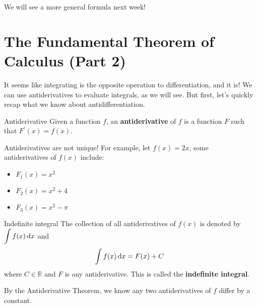 We will see a more general formula next week!

\section{The Fundamental Theorem of Calculus (Part 2)}
It seems like integrating is the opposite operation to
differentiation, and it is! We can use antiderivatives
to evaluate integrals, as we will see. But first, let's
quickly recap what we know about antidifferentiation.

\begin{Definition}{Antiderivative}{}
    Given a function $ f $, an \textbf{antiderivative} of
    $ f $ is a function $ F $ such that $ F^\prime(x)=f(x) $.
\end{Definition}

\begin{Remark}{}{}
    Antiderivatives are not unique! For example, let $ f(x)=2x $, some
    antiderivatives of $ f(x) $ include:
    \begin{itemize}
        \item $ F_1(x)=x^2 $
        \item $ F_2(x)=x^2+4 $
        \item $ F_3(x)=x^2-\pi $
    \end{itemize}
\end{Remark}

\begin{Definition}{Indefinite integral}{}
    The collection of all antiderivatives of $ f(x) $ is denoted
    by $ \displaystyle\int f(x)\odif{x} $ and
    \[ \int f(x)\odif{x} =F(x)+C \]
    where $ C\in\mathbb{R} $ and $ F $ is any antiderivative.
    This is called the \textbf{indefinite integral}.
\end{Definition}

\begin{Remark}{}{}
    By the Antiderivative Theorem, we know any two antiderivatives
    of $ f $ differ by a constant.
\end{Remark}

